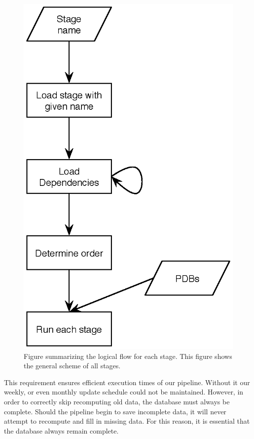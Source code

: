 \begin{figure}
\includegraphics{chapter-2/figs/overall-flow}
\caption{Figure summarizing the logical flow for each stage. This figure shows
the general scheme of all stages.}
\label{fig:stage-flow}
\end{figure}

This requirement ensures efficient execution times of our pipeline. Without it
our weekly, or even monthly update schedule could not be maintained. However, in
order to correctly skip recomputing old data, the database must always be
complete. Should the pipeline begin to save incomplete data, it will never
attempt to recompute and fill in missing data. For this reason, it is essential
that the database always remain complete.

